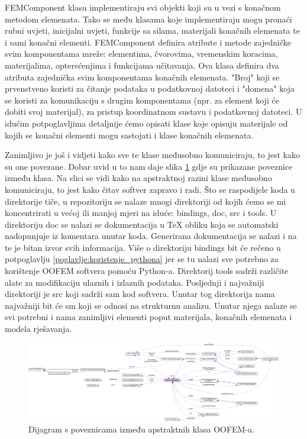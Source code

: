 \documentclass[a4paper,twoside,12pt]{memoir} %
\begin{document}
FEMComponent klasu implementiraju svi objekti koji su u vezi s konačnom metodom elemenata. Tako se među klasama koje implementiraju mogu pronaći rubni uvjeti, inicijalni uvjeti, funkcije sa silama, materijali konačnih elemenata te i sami konačni elementi. FEMComponent definira atribute i metode zajedničke svim komponentama mreže: elementima, čvorovima, vremenskim koracima, materijalima, opterećenjima i funkcijama učitavanja. Ova klasa definira dva atributa zajednička svim komponentama konačnih elemenata. "Broj" koji se prvenstveno koristi za čitanje podataka u podatkovnoj datoteci i "domena" koja se koristi za komunikaciju s drugim komponentama (npr. za element koji će dobiti svoj materijal), za pristup koordinatnom sustavu i podatkovnoj datoteci. U idućim potpoglavljima detaljnije ćemo opisati klase koje opisuju materijale od kojih se konačni elementi mogu sastojati i klase konačnih elemenata. \par

Zanimljivo je još i vidjeti kako sve te klase međusobno komuniciraju, to jest kako su one povezane. Dobar uvid u to nam daje slika \ref{fig:EngngModel_connections} gdje su prikazane poveznice između klasa. Na slici se vidi kako na apstraktnoj razini klase međusobno komuniciraju, to jest kako čitav softver zapravo i radi. Što se raspodijele koda u direktorije tiče, u repozitoriju \cite{oofem_github} se nalaze mnogi direktoriji od kojih ćemo se mi koncentrirati u većoj ili manjoj mjeri na iduće: bindings, doc, src i tools. U direktoriju doc se nalazi se dokumentacija u TeX obliku koja se automatski nadopunjuje iz komentara unutar koda. Generirana dokumentacija se nalazi i na \cite{oofem-web} te je bitan izvor svih informacija. Više o direktoriju bindings bit će rečeno u potpoglavlju \ref{poglavlje:koristenje_pythona} jer se tu nalazi sve potrebno za korištenje OOFEM softvera pomoću Python-a. Direktorij tools sadrži različite alate za modifikaciju ulaznih i izlaznih podataka. Posljednji i najvažniji direktoriji je src koji sadrži sam kod softvera. Unutar tog direktorija nama najvažniji bit će sm koji se odnosi na strukturnu analizu. Unutar njega nalaze se svi potrebni i nama zanimljivi elementi poput materijala, konačnih elemenata i modela rješavanja.

\begin{figure}[h!t]
\begin{center}
\includegraphics[scale=0.2, angle=90]{pictures/chapter_oofem/EngngModel_connections.png}
\caption{Dijagram s poveznicama između apstraktnih klasa OOFEM-a. \cite{oofem_reference}}
\label{fig:EngngModel_connections}
\end{center}
\end{figure}
\end{document}

